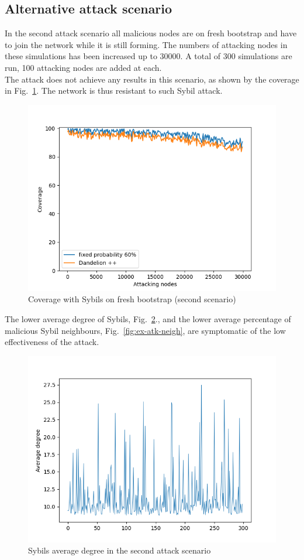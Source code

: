\documentclass[12pt, letterpaper, twoside]{article}
\begin{document}
\subsection{Alternative attack scenario}\label{sec:external}
In the second attack scenario all malicious nodes are on fresh bootstrap and have to join the network while it is still forming. The numbers of attacking nodes in these simulations has been increased up to 30000. A total of 300 simulations are run, 100 attacking nodes are added at each.\\

The attack does not achieve any results in this scenario, as shown by the coverage in Fig.~\ref{fig:ext-cov}. The network is thus resistant to such Sybil attack.\\

\begin{figure}[h!]
	\includegraphics[width=.7\textwidth]{pict/results/ext-cov.png}
	\centering
	\caption{Coverage with Sybils on fresh bootstrap (second scenario)}
	\label{fig:ext-cov}
\end{figure}

The lower average degree of Sybils, Fig.~\ref{fig:ex-atk-degree}., and the lower average percentage of malicious Sybil neighbours, Fig.~\ref{fig:ex-atk-neigh}, are symptomatic of the low effectiveness of the attack.\\

\begin{figure}[h!]
	\includegraphics[width=.7\textwidth]{pict/results/ex-atk-avg-degree.png}
	\centering
	\caption{Sybils average degree in the second attack scenario}
	\label{fig:ex-atk-degree}
\end{figure}
\end{document}
